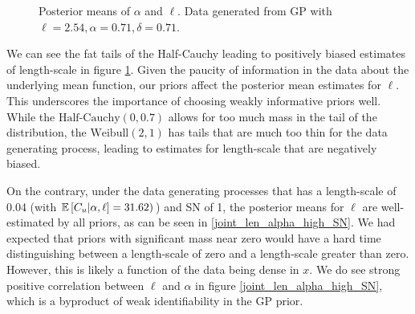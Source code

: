 \documentclass{article}
\newcommand{\Exp}[1]{\ensuremath{\mathbb{E} \lb #1 \rb}}
\newcommand{\lb}{\ensuremath{\left[}}
\newcommand{\rb}{\ensuremath{\right]}}
\begin{document}
\begin{figure}[h]
  \centering
  \caption{Posterior means of $\alpha$ and $\ell$. Data generated from GP with $\ell = 2.54, \alpha = 0.71, \delta = 0.71$.} \label{joint_len_alpha}
\end{figure}

We can see the fat tails of the Half-Cauchy leading to positively biased
estimates of length-scale in figure \ref{joint_len_alpha}. Given the paucity of
information in the data about the underlying mean function, our priors affect
the posterior mean estimates for $\ell$. This underscores the importance of
choosing weakly informative priors well. While the $\text{Half-Cauchy}(0, 0.7)$
allows for too much mass in the tail of the distribution, the
$\text{Weibull}(2, 1)$ has tails that are much too thin for the data generating
process, leading to estimates for length-scale that are negatively biased.

On the contrary, under the data generating processes that has a length-scale of
0.04 (with $\Exp{C_u | \alpha, \ell} = 31.62)$) and SN of 1, the posterior
means for $\ell$ are well-estimated by all priors, as can be seen in
\ref{joint_len_alpha_high_SN}. We had expected that priors with significant
mass near zero would have a hard time distinguishing between a length-scale of
zero and a length-scale greater than zero. However, this is likely a function
of the data being dense in $x$. We do see strong positive correlation between
$\ell$ and $\alpha$ in figure \ref{joint_len_alpha_high_SN}, which is a
byproduct of weak identifiability in the GP prior.
\end{document}
